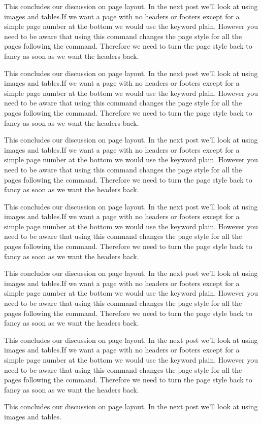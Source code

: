 This concludes our discussion on page layout. In the next post we'll look at using images and tables.If we want a page with no headers or footers except for a simple page number at the bottom we would use the keyword plain. However you need to be aware that using this command changes the page style for all the pages following the command. Therefore we need to turn the page style back to fancy as soon as we want the headers back.

This concludes our discussion on page layout. In the next post we'll look at using images and tables.If we want a page with no headers or footers except for a simple page number at the bottom we would use the keyword plain. However you need to be aware that using this command changes the page style for all the pages following the command. Therefore we need to turn the page style back to fancy as soon as we want the headers back.

This concludes our discussion on page layout. In the next post we'll look at using images and tables.If we want a page with no headers or footers except for a simple page number at the bottom we would use the keyword plain. However you need to be aware that using this command changes the page style for all the pages following the command. Therefore we need to turn the page style back to fancy as soon as we want the headers back.

This concludes our discussion on page layout. In the next post we'll look at using images and tables.If we want a page with no headers or footers except for a simple page number at the bottom we would use the keyword plain. However you need to be aware that using this command changes the page style for all the pages following the command. Therefore we need to turn the page style back to fancy as soon as we want the headers back.

This concludes our discussion on page layout. In the next post we'll look at using images and tables.If we want a page with no headers or footers except for a simple page number at the bottom we would use the keyword plain. However you need to be aware that using this command changes the page style for all the pages following the command. Therefore we need to turn the page style back to fancy as soon as we want the headers back.

This concludes our discussion on page layout. In the next post we'll look at using images and tables.If we want a page with no headers or footers except for a simple page number at the bottom we would use the keyword plain. However you need to be aware that using this command changes the page style for all the pages following the command. Therefore we need to turn the page style back to fancy as soon as we want the headers back.

This concludes our discussion on page layout. In the next post we'll look at using images and tables.